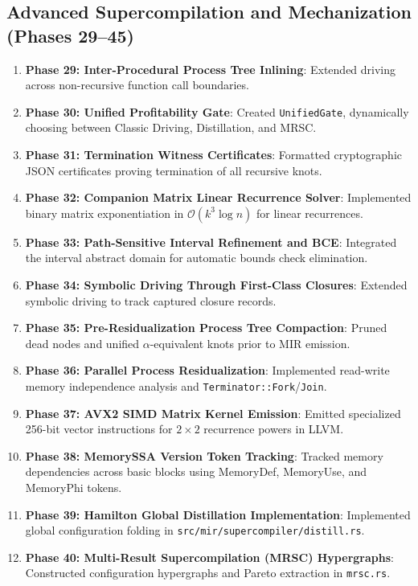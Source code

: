 \subsection{Advanced Supercompilation and Mechanization (Phases 29--45)}
\begin{enumerate}
    \item \textbf{Phase 29: Inter-Procedural Process Tree Inlining}: Extended driving across non-recursive function call boundaries.
    \item \textbf{Phase 30: Unified Profitability Gate}: Created \texttt{UnifiedGate}, dynamically choosing between Classic Driving, Distillation, and MRSC.
    \item \textbf{Phase 31: Termination Witness Certificates}: Formatted cryptographic JSON certificates proving termination of all recursive knots.
    \item \textbf{Phase 32: Companion Matrix Linear Recurrence Solver}: Implemented binary matrix exponentiation in $\mathcal{O}(k^3 \log n)$ for linear recurrences.
    \item \textbf{Phase 33: Path-Sensitive Interval Refinement and BCE}: Integrated the interval abstract domain for automatic bounds check elimination.
    \item \textbf{Phase 34: Symbolic Driving Through First-Class Closures}: Extended symbolic driving to track captured closure records.
    \item \textbf{Phase 35: Pre-Residualization Process Tree Compaction}: Pruned dead nodes and unified $\alpha$-equivalent knots prior to MIR emission.
    \item \textbf{Phase 36: Parallel Process Residualization}: Implemented read-write memory independence analysis and \texttt{Terminator::Fork}/\texttt{Join}.
    \item \textbf{Phase 37: AVX2 SIMD Matrix Kernel Emission}: Emitted specialized 256-bit vector instructions for $2 \times 2$ recurrence powers in LLVM.
    \item \textbf{Phase 38: MemorySSA Version Token Tracking}: Tracked memory dependencies across basic blocks using MemoryDef, MemoryUse, and MemoryPhi tokens.
    \item \textbf{Phase 39: Hamilton Global Distillation Implementation}: Implemented global configuration folding in \texttt{src/mir/supercompiler/distill.rs}.
    \item \textbf{Phase 40: Multi-Result Supercompilation (MRSC) Hypergraphs}: Constructed configuration hypergraphs and Pareto extraction in \texttt{mrsc.rs}.

\end{enumerate}
